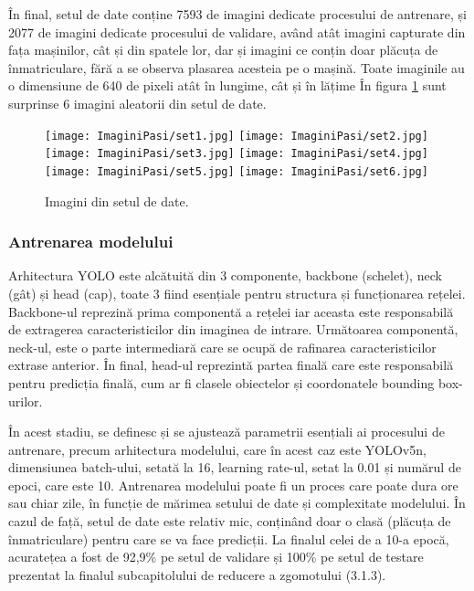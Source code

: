\documentclass[12pt]{article}
\begin{document}
\^{I}n final, setul de date conține 7593 de imagini dedicate procesului de antrenare, și 2077 de imagini dedicate procesului de validare, av\^{a}nd at\^{a}t imagini capturate din fața mașinilor, c\^{a}t și din spatele lor, dar și imagini ce conțin doar pl\u{a}cuța de \^{i}nmatriculare, f\u{a}r\u{a} a se observa plasarea acesteia pe o mașin\u{a}. Toate imaginile au o dimensiune de 640 de pixeli at\^{a}t \^{i}n lungime, c\^{a}t și \^{i}n l\u{a}țime \^{I}n figura \ref{fig:imagini_set_date} sunt surprinse 6 imagini aleatorii din setul de date.

\begin{figure}[H]
  \centering
  \texttt{[image: ImaginiPasi/set1.jpg]}\hfill
  \texttt{[image: ImaginiPasi/set2.jpg]}\hfill
    \texttt{[image: ImaginiPasi/set3.jpg]}
    \texttt{[image: ImaginiPasi/set4.jpg]}\hfill
  \texttt{[image: ImaginiPasi/set5.jpg]}\hfill
    \texttt{[image: ImaginiPasi/set6.jpg]}
  \caption{Imagini din setul de date.}
  \label{fig:imagini_set_date}
\end{figure}

\subsubsection{Antrenarea modelului}

Arhitectura YOLO este alc\u{a}tuit\u{a} din 3 componente, backbone (schelet), neck (g\^{a}t) și head (cap), toate 3 fiind esențiale pentru structura și funcționarea rețelei. Backbone-ul reprezin\u{a} prima component\u{a} a rețelei iar aceasta este responsabil\u{a} de extragerea caracteristicilor din imaginea de intrare. Urm\u{a}toarea component\u{a}, neck-ul, este o parte intermediar\u{a} care se ocup\u{a} de rafinarea caracteristicilor extrase anterior. \^{I}n final, head-ul reprezint\u{a} partea final\u{a} care este responsabil\u{a} pentru predicția final\u{a}, cum ar fi clasele obiectelor și coordonatele bounding box-urilor.

\^{I}n acest stadiu, se definesc și se ajusteaz\u{a} parametrii esențiali ai procesului de antrenare, precum arhitectura modelului, care \^{i}n acest caz este YOLOv5n, dimensiunea batch-ului, setat\u{a} la 16, learning rate-ul, setat la 0.01 și num\u{a}rul de epoci, care este 10. Antrenarea modelului poate fi un proces care poate dura ore sau chiar zile, \^{i}n funcție de m\u{a}rimea setului de date și complexitate modelului. \^{I}n cazul de faț\u{a}, setul de date este relativ mic, conțin\^{a}nd doar o clas\u{a} (pl\u{a}cuța de \^{i}nmatriculare) pentru care se va face predicții. La finalul celei de a 10-a epoc\u{a}, acuratețea a fost de 92,9\% pe setul de validare și 100\% pe setul de testare prezentat la finalul subcapitolului de reducere a zgomotului (3.1.3).
\end{document}

